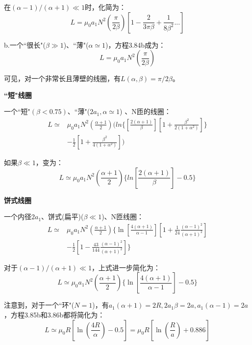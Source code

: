在$(\alpha−1)/(\alpha+1)\ll 1$时，化简为：
\begin{equation*}
  L=\mu_0a_1N^2\left(\frac{\pi}{2\beta}\right)\left[1-\frac{2}{3\pi\beta}+\frac{1}{8\beta^2}...\right] \tag{3.84b}%
\end{equation*}

b.一个``很长"($\beta\gg 1$)、``薄"($\alpha \simeq 1$)，方程3.84b成为：
\begin{equation*}
  L=\mu_0a_1N^2(\frac{\pi}{2\beta}) \tag{3.84c}%
\end{equation*}

可见，对一个非常长且薄壁的线圈，有$L(\alpha,\beta)=\pi/2\beta$。

\textbf{``短"线圈}

 一个``短"$(\beta<0.75)$、``薄"($2a_1,\alpha\simeq 1$) 、N匝的线圈：
  \begin{equation}
  \begin{split}
L\simeq&\mu_0a_1N^2(\frac{\alpha+1}{2})(ln\{[\frac{2(\alpha+1)}{\beta}][1+\frac{\beta^2}{2(1+\alpha^2)}]\}\\
&-\frac{1}{2}[1+\frac{\beta^2}{4(1+\alpha^2)}])%
  \end{split}
  \end{equation}
  
  如果$\beta \ll 1$，变为：
  \begin{equation*}
L\simeq\mu_0a_1N^2(\frac{\alpha+1}{2})\{ln[\frac{2(\alpha+1)}{\beta}]-0.5\} \tag{3.85'}%
\end{equation*}

\textbf{饼式线圈}

  一个内径$2a_1$、饼式(扁平)($\beta\ll 1$)、N匝线圈：
  \begin{equation}
  \begin{split}
L\simeq & \mu_0a_1N^2(\frac{\alpha+1}{2})\{\ln[\frac{4(\alpha+1)}{\alpha-1}][1+\frac{1}{24}\frac{(\alpha-1)^2}{(\alpha+1)^2}]\\
&-\frac{1}{2}[1-\frac{43}{144}\frac{(\alpha-1)^2}{(\alpha+1)^2}]\}%
  \end{split}
\end{equation}

对于$(\alpha-1)/(\alpha+1)\ll 1$，上式进一步简化为：
\begin{equation*}
L\simeq\mu_0a_1N^2(\frac{\alpha+1}{2})\{\ln[\frac{4(\alpha+1)}{\alpha-1}]-0.5\} \tag{3.86'}%
\end{equation*}

注意到，对于一个``环"($N=1$)，有$a_1(\alpha+1)=2R,2a_1\beta=2a,a_1(\alpha-1)=2a$，方程3.85b和3.86b都将简化为：
\begin{equation*}
L\simeq\mu_0R[\ln(\frac{4R}{\alpha})-0.5]=\mu_0R[\ln(\frac{R}{a})+0.886] \tag{3.86''}%
\end{equation*}

